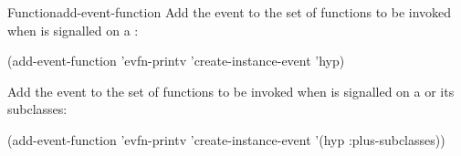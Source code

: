 \documentclass[10pt,twoside,english,pdftex]{article}
\begin{document}
\begin{functiondoc}{Function}{add-event-function}
\fnexamples
{}%
Add the event   to the set of functions
to be invoked when  is signalled on a
 :
\begin{example}
  (add-event-function 'evfn-printv 'create-instance-event 'hyp)
\end{example}

Add the event   to the set of functions
to be invoked when  is signalled on a
  or its subclasses:
\begin{example}
  (add-event-function 'evfn-printv 'create-instance-event '(hyp :plus-subclasses))
\end{example}

\fnnote
\instanceevfnsnyi

\end{functiondoc}

\end{document}
